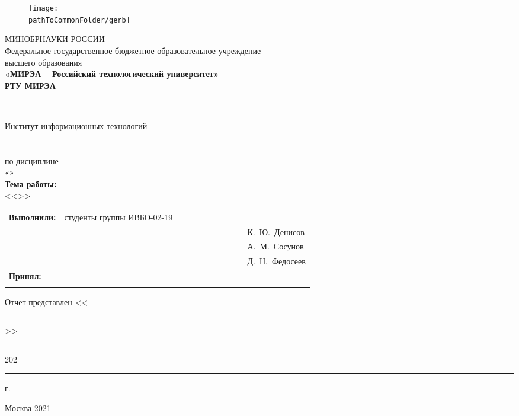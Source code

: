 

\renewcommand{\studentfio}{К.~Ю.~Денисов\\
				& & \hfill А.~М.~Сосунов\\
				& & \hfill Д.~Н.~Федосеев}

\begin{center}
	\begin{figure}[h!]
		\begin{center}
			\texttt{[image: \\pathToCommonFolder/gerb]}
		\end{center}	
	\end{figure}
	\small	МИНОБРНАУКИ РОССИИ \\
	Федеральное государственное бюджетное образовательное учреждение\\
	высшего образования\\
	\normalsize					
	\textbf{«МИРЭА – Российский технологический университет»\\
		РТУ МИРЭА}\\
	\noindent\rule{1\linewidth}{1pt}\\
	Институт информационных технологий\\ %
	\kafedra\\
	\vspace{3ex}
	\large \textbf{\workname}  \\
	по дисциплине\\ «\discipline» \\
	\vspace{3ex}
	\if \withouttheme
	\textbf{Тема работы:}\\ <<\theme>>
	\fi
	\vspace{6ex}
	\small
	\begin{table}[h!]
		\begin{tabular}{lp{0.6\linewidth}l}
			\textbf{Выполнили:} & студенты группы ИВБО-02-19 & \\ 
			& & \hfill \studentfio \\%
			\textbf{Принял:} & \rang & \\
			& & \hfill \teacherfio\\
		\end{tabular}
	\end{table}
	\if \withoutsubmissiondate
	\begin{flushleft}
		Отчет представлен <<\rule{3ex}{1pt}>>\rule{10ex}{1pt} 202\rule{1ex}{1pt} г.
	\end{flushleft}
	\fi
	\normalsize
	
	\vfill
	Москва 2021
	
\end{center}